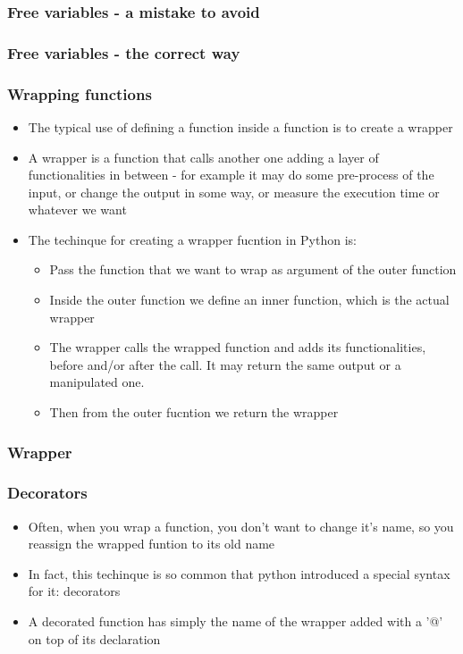 \documentclass[9pt]{beamer}
\begin{document}
\begin{frame}
  \frametitle{Free variables - a mistake to avoid}
  
\end{frame}


\begin{frame}
  \frametitle{Free variables - the correct way}
  
\end{frame}


\begin{frame}
  \frametitle{Wrapping functions}
  \begin{itemize}
    \item The typical use of defining a function inside a function is to create
          a \alert{wrapper}
    \item A wrapper is a function that calls another one adding a layer
          of functionalities in between - for example it may do some pre-process
          of the input, or change the output in some way, or measure the 
          execution time or whatever we want
    \item The techinque for creating a wrapper fucntion in Python is:
    \begin{itemize}
       \item Pass the function that we want to wrap as argument of the outer
             function
       \item Inside the outer function we define an inner function, which is the
             actual wrapper
       \item The wrapper calls the wrapped function and adds its functionalities,
             before and/or after the call. It may return the same output or a 
             manipulated one.
       \item Then from the outer fucntion we return the wrapper
    \end{itemize}
  \end{itemize}
  
\end{frame}


\begin{frame}
  \frametitle{Wrapper}
  
\end{frame}


\begin{frame}
  \frametitle{Decorators}
  \begin{itemize}
    \item Often, when you wrap a function, you don't want to change
          it's name, so you reassign the wrapped funtion to its old name
    \item In fact, this techinque is so common that python introduced a special
          syntax for it: decorators
    \item A decorated function has simply the name of the wrapper added with
          a '@' on top of its declaration
  \end{itemize}
  
\end{frame}
\end{document}
